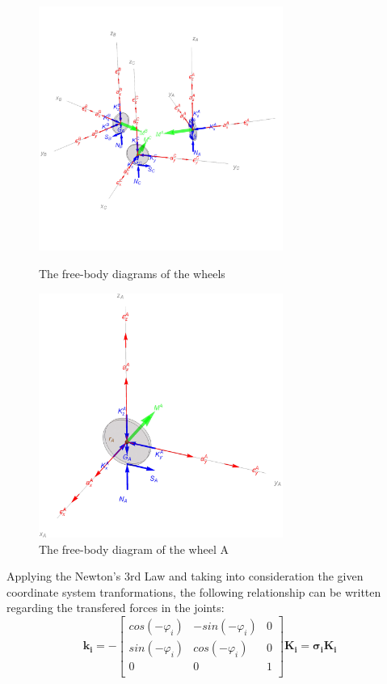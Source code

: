 \documentclass[12pt,english]{article}
\begin{document}
\begin{figure}[htb!]
	\centering
	\includegraphics[height=8cm]{figures/wheelsFBD}
	\caption{The free-body diagrams of the wheels}
	\label{wheelsFBD}
	\endminipage\hfill
	\centering
	\includegraphics[height=8cm]{figures/wheelFBD}
	\caption{The free-body diagram of the wheel A}
	\label{wheelFBD}
	\endminipage\hfill
\end{figure}
Applying the Newton's 3rd Law and taking into consideration the given coordinate system tranformations, the following relationship can be written  regarding the transfered forces in the joints:
\begin{equation}
\mathbf{k_i} = -\left[
\begin{array}{ccc}
cos (-\varphi_i) 	& -sin (-\varphi_i)  	& 0 \\
sin (-\varphi_i)  	& cos (-\varphi_i)  	& 0 \\
0	 			& 0 				& 1 \\
\end{array}
\right] \mathbf{K_i} = \boldsymbol{\sigma_i} \mathbf{K_i}
\end{equation}
\end{document}
